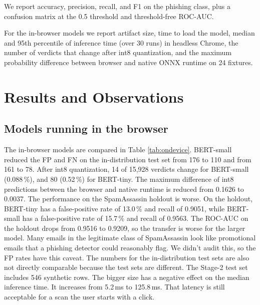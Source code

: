 \documentclass[conference]{IEEEtran}
\begin{document}
We report accuracy, precision, recall, and F1 on the phishing class, plus a confusion matrix at the 0.5 threshold and threshold-free ROC-AUC.

For the in-browser models we report artifact size, time to load the model, median and 95th percentile of inference time (over 30 runs) in headless Chrome, the number of verdicts that change after int8 quantization, and the maximum probability difference between browser and native ONNX runtime on 24 fixtures.

\section{Results and Observations}


\subsection{Models running in the browser}
The in-browser models are compared in Table \ref{tab:ondevice}. BERT-small reduced the FP and FN on the in-distribution test set from 176 to 110 and from 161 to 78. After int8 quantization, 14 of 15,928 verdicts change for BERT-small (0.088\,\%), and 80 (0.52\,\%) for BERT-tiny. The maximum difference of int8 predictions between the browser and native runtime is reduced from 0.1626 to 0.0037. The performance on the SpamAssassin holdout is worse. On the holdout, BERT-tiny has a false-positive rate of 13.0\,\% and recall of 0.9051, while BERT-small has a false-positive rate of 15.7\,\% and recall of 0.9563. The ROC-AUC on the holdout drops from 0.9516 to 0.9209, so the transfer is worse for the larger model. Many emails in the legitimate class of SpamAssassin look like promotional emails that a phishing detector could reasonably flag. We didn't audit this, so the FP rates have this caveat. The numbers for the in-distribution test sets are also not directly comparable because the test sets are different. The Stage-2 test set includes 546 synthetic rows. The bigger size has a negative effect on the median inference time. It increases from 5.2\,ms to 125.8\,ms. That latency is still acceptable for a scan the user starts with a click.
\end{document}
